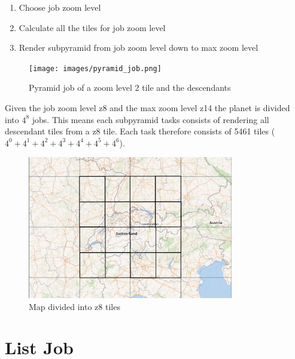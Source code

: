 \begin{enumerate}  
    \item Choose job zoom level
    \item Calculate all the tiles for job zoom level
    \item Render subpyramid from job zoom level down to max zoom level
\end{enumerate}

\begin{figure}[H]
  \centering
  \texttt{[image: images/pyramid\_job.png]}
  \caption{Pyramid job of a zoom level 2 tile and the descendants}
\end{figure}


Given the job zoom level z8 and the max zoom level z14 the planet is divided into $4^{8}$ jobs.
This means each subpyramid tasks consists of rendering all descendant tiles from a z8 tile.
Each task therefore consists of 5461 tiles ($4^{0}+4^{1}+4^{2}+4^{3}+4^{4}+4^{5}+4^{6}$). \\

\begin{figure}[H]
  \centering
  \includegraphics[width=0.8\textwidth]{images/switzerland_tiled_z8.png}
  \caption{Map divided into z8 tiles}
\end{figure}

\section{List Job}
